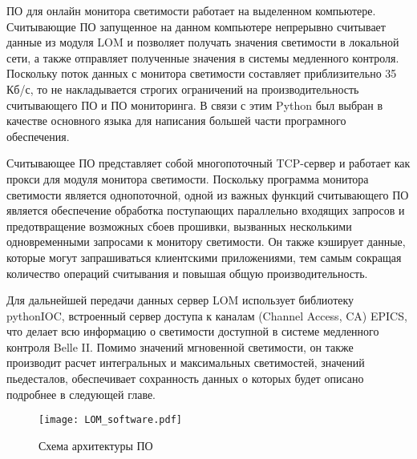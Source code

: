   ПО для онлайн монитора светимости работает на выделенном компьютере. Считывающие ПО запущенное на данном компьютере непрерывно считывает данные из модуля LOM и позволяет получать значения светимости в локальной сети, а также отправляет полученные значения в системы медленного контроля. Поскольку поток данных с монитора светимости составляет приблизительно 35 Кб/с, то не накладывается строгих ограничений на производительность считывающего ПО и ПО мониторинга. В связи с этим Python был выбран в качестве основного языка для написания большей части програмного обеспечения.\par
  Считывающее ПО представляет собой многопоточный TCP-сервер и работает как прокси для модуля монитора светимости. Поскольку программа монитора светимости является однопоточной, одной из важных функций считывающего ПО является обеспечение обработка поступающих параллельно входящих запросов и предотвращение возможных сбоев прошивки, вызванных несколькими одновременными запросами к монитору светимости. Он также кэширует данные, которые могут запрашиваться клиентскими приложениями, тем самым сокращая количество операций считывания и повышая общую производительность.\par
  Для дальнейшей передачи данных сервер LOM использует библиотеку pythonIOC, встроенный сервер доступа к каналам (Channel Access, CA) EPICS, что делает всю информацию о светимости доступной в системе медленного контроля Belle II. Помимо значений мгновенной светимости, он также производит расчет интегральных и максимальных светимостей, значений пьедесталов, обеспечивает сохранность данных о которых будет описано подробнее в следующей главе.
\begin{figure}[htp]
  \centering
  \texttt{[image: LOM\_software.pdf]}
  \caption{Схема архитектуры ПО}
  \label{fig:galaxy}
\end{figure}
